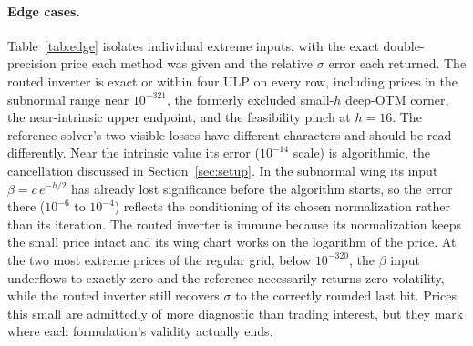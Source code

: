 \documentclass[11pt]{article}
\begin{document}
\paragraph{Edge cases.}
Table~\ref{tab:edge} isolates individual extreme inputs, with the exact double-precision price each method was given and the relative $\sigma$ error each returned. The routed inverter is exact or within four ULP on every row, including prices in the subnormal range near $10^{-321}$, the formerly excluded small-$h$ deep-OTM corner, the near-intrinsic upper endpoint, and the feasibility pinch at $h=16$. The reference solver's two visible losses have different characters and should be read differently. Near the intrinsic value its error ($10^{-14}$ scale) is algorithmic, the cancellation discussed in Section~\ref{sec:setup}. In the subnormal wing its input $\beta=c\,e^{-h/2}$ has already lost significance before the algorithm starts, so the error there ($10^{-6}$ to $10^{-4}$) reflects the conditioning of its chosen normalization rather than its iteration. The routed inverter is immune because its normalization keeps the small price intact and its wing chart works on the logarithm of the price. At the two most extreme prices of the regular grid, below $10^{-320}$, the $\beta$ input underflows to exactly zero and the reference necessarily returns zero volatility, while the routed inverter still recovers $\sigma$ to the correctly rounded last bit. Prices this small are admittedly of more diagnostic than trading interest, but they mark where each formulation's validity actually ends.
\end{document}
